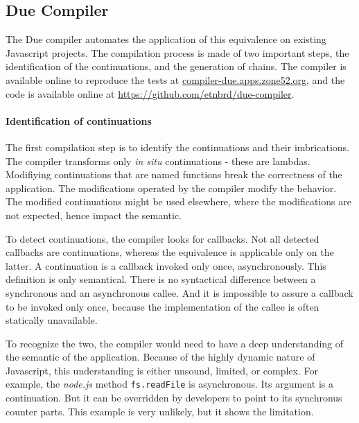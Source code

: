 \subsection{Due Compiler} \label{chapter5:due:compiler}

The Due compiler automates the application of this equivalence on existing Javascript projects.
The compilation process is made of two important steps, the identification of the continuations, and the generation of chains.
The compiler is available online to reproduce the tests at \url{compiler-due.apps.zone52.org}, and the code is available online at \url{https://github.com/etnbrd/due-compiler}.

\paragraph{Identification of continuations}

The first compilation step is to identify the continuations and their imbrications.
The compiler transforms only \textit{in situ} continuations - these are lambdas.
Modifiying continuations that are named functions break the correctness of the application.
The modifications operated by the compiler modify the behavior.
The modified continuations might be used elsewhere, where the modifications are not expected, hence impact the semantic.

To detect continuations, the compiler looks for callbacks.
Not all detected callbacks are continuations, whereas the equivalence is applicable only on the latter.
A continuation is a callback invoked only once, asynchronously.
This definition is only semantical.
There is no syntactical difference between a synchronous and an asynchronous callee.
And it is impossible to assure a callback to be invoked only once, because the implementation of the callee is often statically unavailable.

To recognize the two, the compiler would need to have a deep understanding of the semantic of the application.
Because of the highly dynamic nature of Javascript, this understanding is either unsound, limited, or complex.
For example, the \textit{node.js} method \texttt{fs.readFile} is asynchronous.
Its argument is a continuation.
But it can be overridden by developers to point to its synchronus counter parts.
This example is very unlikely, but it shows the limitation.

